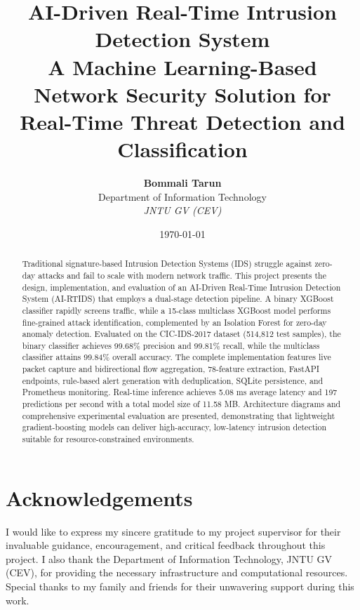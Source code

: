 \documentclass[12pt,a4paper]{article}
\title{\Huge\textbf{AI-Driven Real-Time Intrusion Detection System}\\ \vspace{0.5cm}
\normalsize A Machine Learning-Based Network Security Solution for Real-Time Threat Detection and Classification}
\author{
     \textbf{Bommali Tarun} \\
     \vspace{0.3cm}
     \vspace{0.2cm}
     Department of Information Technology\\
     \textit{JNTU GV (CEV)} \\
 }
\date{\today}
\begin{document}
\maketitle

\newpage
\section*{Acknowledgements}
I would like to express my sincere gratitude to my project supervisor for their invaluable guidance, encouragement, and critical feedback throughout this project. I also thank the Department of Information Technology, JNTU GV (CEV), for providing the necessary infrastructure and computational resources. Special thanks to my family and friends for their unwavering support during this work.

\begin{abstract}
Traditional signature-based Intrusion Detection Systems (IDS) struggle against zero-day attacks and fail to scale with modern network traffic. This project presents the design, implementation, and evaluation of an AI-Driven Real-Time Intrusion Detection System (AI-RTIDS) that employs a dual-stage detection pipeline. A binary XGBoost classifier rapidly screens traffic, while a 15-class multiclass XGBoost model performs fine-grained attack identification, complemented by an Isolation Forest for zero-day anomaly detection. Evaluated on the CIC-IDS-2017 dataset (514,812 test samples), the binary classifier achieves 99.68\% precision and 99.81\% recall, while the multiclass classifier attains 99.84\% overall accuracy. The complete implementation features live packet capture and bidirectional flow aggregation, 78-feature extraction, FastAPI endpoints, rule-based alert generation with deduplication, SQLite persistence, and Prometheus monitoring. Real-time inference achieves 5.08 ms average latency and 197 predictions per second with a total model size of 11.58 MB. Architecture diagrams and comprehensive experimental evaluation are presented, demonstrating that lightweight gradient-boosting models can deliver high-accuracy, low-latency intrusion detection suitable for resource-constrained environments.
\end{abstract}
\end{document}
